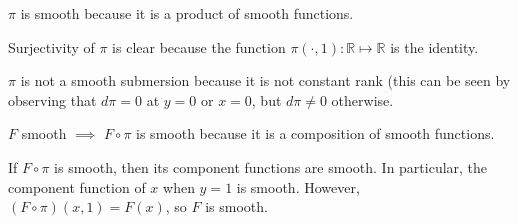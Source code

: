$\pi$ is smooth because it is a product of smooth functions.

Surjectivity of $\pi$ is clear because the function $\pi(\cdot, 1):\mathbb{R}\mapsto\mathbb{R}$ is the identity.

$\pi$ is not a smooth submersion because it is not constant rank (this can be seen by observing that $d\pi=0$ at $y=0$ or $x=0$, but $d\pi\neq0$ otherwise.

$F$ smooth $\implies$ $F \circ \pi$ is smooth because it is a composition of smooth functions.

If $F \circ \pi$ is smooth, then its component functions are smooth. In particular, the component function of $x$ when $y=1$ is smooth.  However, $(F\circ\pi) (x,1) = F(x)$, so $F$ is smooth.
